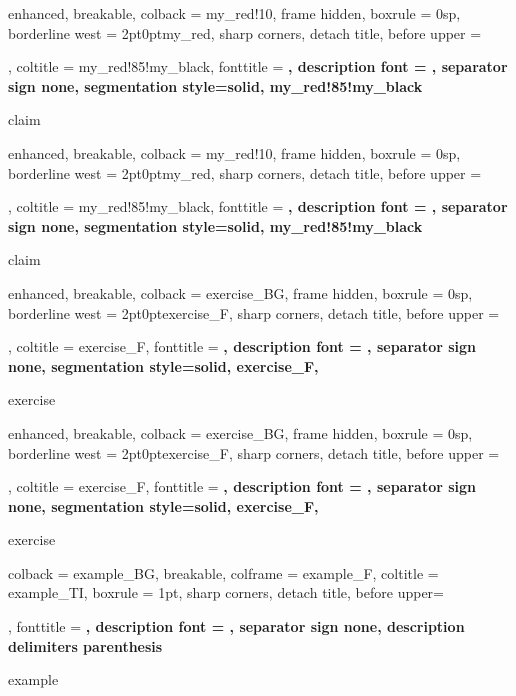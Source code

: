 {
	enhanced,
	breakable,
	colback = my_red!10,
	frame hidden,
	boxrule = 0sp,
	borderline west = {2pt}{0pt}{my_red},
	sharp corners,
	detach title,
	before upper = \tcbtitle\par\smallskip,
	coltitle = my_red!85!my_black,
	fonttitle = \bfseries\sffamily,
	description font = \mdseries,
	separator sign none,
	segmentation style={solid, my_red!85!my_black}
}
{claim}

{
	enhanced,
	breakable,
	colback = my_red!10,
	frame hidden,
	boxrule = 0sp,
	borderline west = {2pt}{0pt}{my_red},
	sharp corners,
	detach title,
	before upper = \tcbtitle\par\smallskip,
	coltitle = my_red!85!my_black,
	fonttitle = \bfseries\sffamily,
	description font = \mdseries,
	separator sign none,
	segmentation style={solid, my_red!85!my_black}
}
{claim}

{
	enhanced,
	breakable,
	colback = exercise_BG,
	frame hidden,
	boxrule = 0sp,
	borderline west = {2pt}{0pt}{exercise_F},
	sharp corners,
	detach title,
	before upper = \tcbtitle\par\smallskip,
	coltitle = exercise_F,
	fonttitle = \bfseries\sffamily,
	description font = \mdseries,
	separator sign none,
	segmentation style={solid, exercise_F},
}
{exercise}

{
	enhanced,
	breakable,
	colback = exercise_BG,
	frame hidden,
	boxrule = 0sp,
	borderline west = {2pt}{0pt}{exercise_F},
	sharp corners,
	detach title,
	before upper = \tcbtitle\par\smallskip,
	coltitle = exercise_F,
	fonttitle = \bfseries\sffamily,
	description font = \mdseries,
	separator sign none,
	segmentation style={solid, exercise_F},
}
{exercise}

{
	colback = example_BG,
	breakable,
	colframe = example_F,
	coltitle = example_TI,
	boxrule = 1pt,
	sharp corners,
	detach title,
	before upper=\tcbtitle\par\smallskip,
	fonttitle = \bfseries,
	description font = \mdseries,
	separator sign none,
	description delimiters parenthesis
}
{example}

